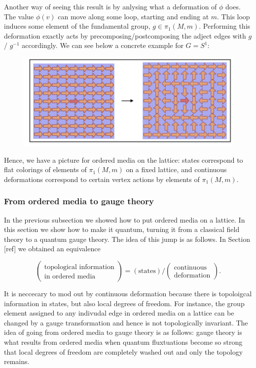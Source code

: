 \documentclass{article}
\theoremstyle{definition}
\newcommand{\0}{\left|0\right>}
\newcommand{\1}{\left|1\right>}
\numberwithin{figure}{section}
\begin{document}
Another way of seeing this result is by anlysing what a deformation of $\phi$ does. The value $\phi(v)$ can move along some loop, starting and ending at $m$. This loop induces some element of the fundamental group, $g\in \pi_1(M,m)$. Performing this deformation exactly acts by precomposing/postcomposing the adject edges with $g$/ $g^{-1}$ accordingly. We can see below a concrete example for $G=S^{1}$:

\begin{figure}[h]
\begin{center}
\includegraphics[scale=.45]{twisting}
\end{center}
\end{figure}

Hence, we have a picture for ordered media on the lattice: states correspond to flat colorings of elements of $\pi_1(M,m)$ on a fixed lattice, and continuous deformations correspond to certain vertex actions by elements of $\pi_1(M,m)$.

\subsubsection{From ordered media to gauge theory}

In the previous subsection we showed how to put ordered media on a lattice. In this section we show how to make it quantum, turning it from a classical field theory to a quantum gauge theory. The idea of this jump is as follows. In Section [ref] we obtained an equivalence

$$
\left(\substack{\text{topological information}\\ \text{in ordered media}}\right)=\left(\text{states}\right)/\left(\substack{\text{continuous} \\ \text{deformation}}\right).
$$

It is neccecary to mod out by continuous deformation because there is topoloigcal information in states, but also local degrees of freedom. For instance, the group element assigned to any indivudal edge in ordered media on a lattice can be changed by a gauge transformation and hence is not topologically invariant. The idea of going from ordered media to gauge theory is as follows: gauge theory is what results from ordered media when quantum fluxtuations become so strong that local degrees of freedom are completely washed out and only the topology remains.
\end{document}
